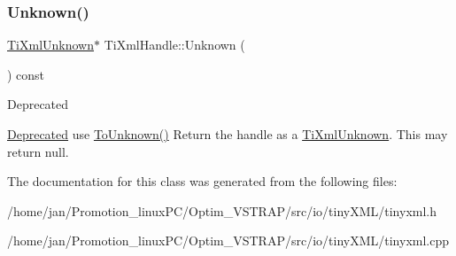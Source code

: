 \subsubsection{\texorpdfstring{Unknown()}{Unknown()}}
{\footnotesize\ttfamily \hyperlink{classTiXmlUnknown}{Ti\+Xml\+Unknown}$\ast$ Ti\+Xml\+Handle\+::\+Unknown (\begin{DoxyParamCaption}{ }\end{DoxyParamCaption}) const\hspace{0.3cm}{\ttfamily [inline]}}

\begin{DoxyRefDesc}{Deprecated}
\item[\hyperlink{deprecated__deprecated000004}{Deprecated}]use \hyperlink{classTiXmlHandle_a450ec91dac1ded02d72eb918d062ad31}{To\+Unknown()} Return the handle as a \hyperlink{classTiXmlUnknown}{Ti\+Xml\+Unknown}. This may return null. \end{DoxyRefDesc}


The documentation for this class was generated from the following files\+:\begin{DoxyCompactItemize}
\item 
/home/jan/\+Promotion\+\_\+linux\+P\+C/\+Optim\+\_\+\+V\+S\+T\+R\+A\+P/src/io/tiny\+X\+M\+L/tinyxml.\+h\item 
/home/jan/\+Promotion\+\_\+linux\+P\+C/\+Optim\+\_\+\+V\+S\+T\+R\+A\+P/src/io/tiny\+X\+M\+L/tinyxml.\+cpp\end{DoxyCompactItemize}

